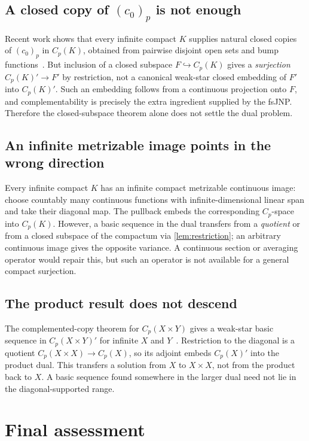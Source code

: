 \documentclass[11pt]{article}
\newcommand{\Cp}{C_p}
\newcommand{\czerop}{(c_0)_p}
\begin{document}
\subsection*{A closed copy of $\czerop$ is not enough}
Recent work shows that every infinite compact $K$ supplies natural closed
copies of $\czerop$ in $\Cp(K)$, obtained from pairwise disjoint open sets and
bump functions~\cite{KMS2023}.  But inclusion of a closed subspace
$F\hookrightarrow\Cp(K)$ gives a \emph{surjection}
$\Cp(K)'\to F'$ by restriction, not a canonical weak-star closed embedding of
$F'$ into $\Cp(K)'$.  Such an embedding follows from a continuous projection
onto $F$, and complementability is precisely the extra ingredient supplied by
the fsJNP.  Therefore the closed-subspace theorem alone does not settle the
dual problem.

\subsection*{An infinite metrizable image points in the wrong direction}
Every infinite compact $K$ has an infinite compact metrizable continuous image:
choose countably many continuous functions with infinite-dimensional linear
span and take their diagonal map.  The pullback embeds the corresponding
$\Cp$-space into $\Cp(K)$.  However, a basic sequence in the dual transfers
from a \emph{quotient} or from a closed subspace of the compactum via
\cref{lem:restriction}; an arbitrary continuous image gives the opposite
variance.  A continuous section or averaging operator would repair this, but
such an operator is not available for a general compact surjection.

\subsection*{The product result does not descend}
The complemented-copy theorem for $\Cp(X\times Y)$ gives a weak-star basic
sequence in $\Cp(X\times Y)'$ for infinite $X$ and $Y$~\cite{KMSZ2022}.
Restriction to the diagonal is a quotient
$\Cp(X\times X)\to\Cp(X)$, so its adjoint embeds $\Cp(X)'$ into the product
dual.  This transfers a solution from $X$ to $X\times X$, not from the product
back to $X$.  A basic sequence found somewhere in the larger dual need not lie
in the diagonal-supported range.

\section{Final assessment}
\end{document}
